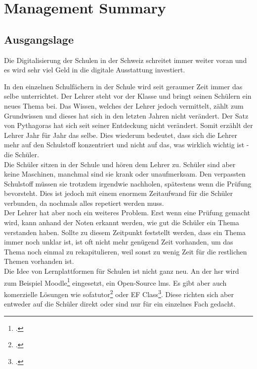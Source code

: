 \section{Management Summary}

\subsection{Ausgangslage}
Die Digitalisierung der Schulen in der Schweiz schreitet immer weiter voran und es wird sehr viel Geld in die digitale Ausstattung investiert. 

In den einzelnen Schulfächern in der Schule wird seit geraumer Zeit immer das selbe unterrichtet. Der Lehrer steht vor der Klasse und bringt seinen Schülern ein neues Thema bei. Das Wissen, welches der Lehrer jedoch vermittelt, zählt zum Grundwissen und dieses hat sich in den letzten Jahren nicht verändert. Der Satz von Pythagoras hat sich seit seiner Entdeckung nicht verändert. Somit erzählt der Lehrer Jahr für Jahr das selbe. Dies wiederum bedeutet, dass sich die Lehrer mehr auf den Schulstoff konzentriert und nicht auf das, was wirklich wichtig ist - die Schüler. \\

Die Schüler sitzen in der Schule und hören dem Lehrer zu. Schüler sind aber keine Maschinen, manchmal sind sie krank oder unaufmerksam. Den verpassten Schulstoff müssen sie trotzdem irgendwie nachholen, spätestens wenn die Prüfung bevorsteht. Dies ist jedoch mit einem enormem Zeitaufwand für die Schüler verbunden, da nochmals alles repetiert werden muss. \\

Der Lehrer hat aber noch ein weiteres Problem. Erst wenn eine Prüfung gemacht wird, kann anhand der Noten erkannt werden, wie gut die Schüler ein Thema verstanden haben. Sollte zu diesem Zeitpunkt feststellt werden, dass ein Thema immer noch unklar ist, ist oft nicht mehr genügend Zeit vorhanden, um das Thema noch einmal zu rekapitulieren, weil sonst zu wenig Zeit für die restlichen Themen vorhanden ist. \\

Die Idee von Lernplattformen für Schulen ist nicht ganz neu. An der \gls{hsr} wird zum Beispiel Moodle\footcite{moodle_homepage} eingesetzt, ein Open-Source \gls{lms}. Es gibt aber auch komerzielle Lösungen wie sofatutor\footcite{sofatutor_homepage} oder EF Class\footcite{ef_class_homepage}. Diese richten sich aber entweder auf die Schüler direkt oder sind nur für ein einzelnes Fach gedacht. \\

